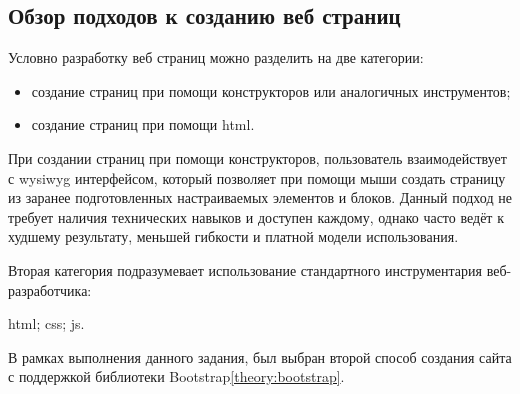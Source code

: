 \subsection{Обзор подходов к созданию веб страниц}

Условно разработку веб страниц можно разделить на две категории:
\begin{itemize}
	\item создание страниц при помощи конструкторов или аналогичных инструментов;
	\item создание страниц при помощи \gls{html}.
\end{itemize}

При создании страниц при помощи конструкторов, пользователь взаимодействует с \gls{wysiwyg} интерфейсом, который позволяет при помощи мыши создать страницу из заранее подготовленных настраиваемых элементов и блоков. Данный подход не требует наличия технических навыков и доступен каждому, однако часто ведёт к худшему результату, меньшей гибкости и платной модели использования.

Вторая категория подразумевает использование стандартного инструментария веб-разработчика:

\begin{itemize}
	\gls{html};
	\gls{css};
	\gls{js}.
\end{itemize}

В рамках выполнения данного задания, был выбран второй способ создания сайта с поддержкой библиотеки Bootstrap\ref{theory:bootstrap}.